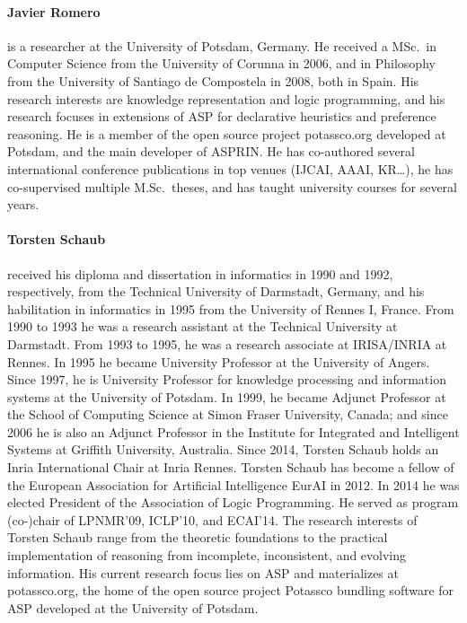 \documentclass{article}
\begin{document}
\paragraph{Javier Romero}
%
is a researcher at the University of Potsdam, Germany.
He received a MSc.\ in Computer Science from the University of Corunna in 2006, and in Philosophy from the University of Santiago de Compostela in 2008, both in Spain.
His research interests are knowledge representation and logic programming, and his research focuses in extensions of ASP for declarative heuristics and
preference reasoning. He is a member of the open source project potassco.org developed at Potsdam, and the main developer of ASPRIN.
%
He has co-authored several international conference publications in top venues (\mbox{IJCAI}, AAAI, KR\ldots),
he has co-supervised multiple M.Sc.\ theses, and has taught university courses for several years.

\paragraph{Torsten Schaub}
%
received his diploma and dissertation in informatics in 1990 and 1992, respectively, from the Technical University of Darmstadt, Germany, and his
habilitation in informatics in 1995 from the University of Rennes I, France. From 1990 to 1993 he was a research assistant at the Technical University
at Darmstadt. From 1993 to 1995, he was a research associate at IRISA/INRIA at Rennes. In 1995 he became University Professor at the University of
Angers. Since 1997, he is University Professor for knowledge processing and information systems at the University of Potsdam. In 1999, he became
Adjunct Professor at the School of Computing Science at Simon Fraser University, Canada; and since 2006 he is also an Adjunct Professor in the
Institute for Integrated and Intelligent Systems at Griffith University, Australia. Since 2014, Torsten Schaub holds an Inria International Chair at
Inria Rennes. Torsten Schaub has become a fellow of the European Association for Artificial Intelligence EurAI in 2012. In 2014 he was elected
President of the Association of Logic Programming. He served as program (co-)chair of LPNMR'09, ICLP'10, and ECAI'14. The research interests of
Torsten Schaub range from the theoretic foundations to the practical implementation of reasoning from incomplete, inconsistent, and evolving
information. His current research focus lies on ASP and materializes at potassco.org, the home of the open source project Potassco
bundling software for ASP developed at the University of Potsdam.
\end{document}

